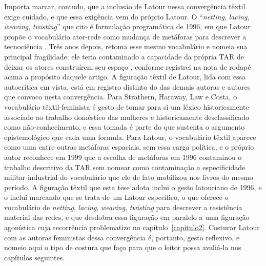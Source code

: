 Importa marcar, contudo, que a inclusão de Latour nessa convergência têxtil exige cuidado, e que essa exigência vem do próprio Latour. O \enquote{\textit{netting}, \textit{lacing}, \textit{weaving}, \textit{twisting}} que cito \parencite[p.~3]{latour1996clarifications} é formulação programática de 1996, em que Latour propõe o vocabulário ator-rede como mudança de metáforas para descrever a tecnociência \parencite[p.~2]{latour1996clarifications}. Três anos depois, \textcite{Latour1999RecallingANT} retoma esse mesmo vocabulário e nomeia sua principal fragilidade: ele teria contaminado a capacidade da própria TAR de deixar os atores construírem seu espaço \parencite[pp.~19--20]{Latour1999RecallingANT}, conforme registrei na nota de rodapé acima a propósito daquele artigo. A figuração têxtil de Latour, lida com essa autocrítica em vista, está em registro distinto do das demais autoras e autores que convoco nesta convergência. Para Strathern, Haraway, Law e Costa, o vocabulário têxtil-feminista é gesto de tomar para si um léxico historicamente associado ao trabalho doméstico das mulheres e historicamente desclassificado como não-conhecimento, e essa tomada é parte do que sustenta o argumento epistemológico que cada uma formula. Para Latour, o vocabulário têxtil aparece como uma entre outras metáforas espaciais, sem essa carga política, e o próprio autor reconhece em 1999 que a escolha de metáforas em 1996 contaminou o trabalho descritivo da TAR sem nomear como contaminação a especificidade militar-industrial do vocabulário que ele de fato mobilizou nos livros do mesmo período. A figuração têxtil que esta tese adota inclui o gesto latouriano de 1996, e o inclui marcando que se trata de um Latour específico, o que oferece o vocabulário de \textit{netting}, \textit{lacing}, \textit{weaving}, \textit{twisting} para descrever a resistência material das redes, e que desdobra essa figuração em paralelo a uma figuração agonística cuja recorrência problematizo no capítulo~\ref{capitulo2}. Costurar Latour com as autoras feministas dessa convergência é, portanto, gesto reflexivo, e nomeio aqui o tipo de costura que faço para que o leitor possa avaliá-la nos capítulos seguintes.


